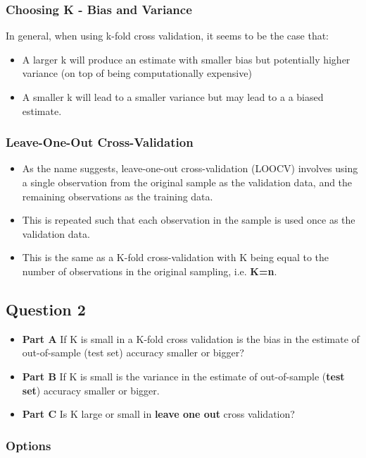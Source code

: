 \documentclass[caret-main.tex]{subfiles}
\begin{document}
\subsubsection{Choosing K - Bias and Variance}
In general, when using k-fold cross validation, it seems to be the case that:
\begin{itemize}
\item A larger k will produce an estimate with smaller bias but potentially higher variance (on top of being computationally expensive)
\item A smaller k will lead to a smaller variance but may lead to a a biased estimate.
\end{itemize}

\subsubsection{Leave-One-Out Cross-Validation}
\begin{itemize}
\item As the name suggests, leave-one-out cross-validation (LOOCV) involves using a single observation from the original sample as the validation data, and the remaining observations as the training data. 
\item This is repeated such that each observation in the sample is used once as the validation data. 
\item This is the same as a K-fold cross-validation with K being equal to the number of observations in the original sampling, i.e. \textbf{K=n}.
\end{itemize}

\newpage

\subsection*{Question 2}
\begin{itemize}
\item \textbf{Part A} If K is small in a K-fold cross validation is the bias in the estimate of
out-of-sample (test set) accuracy smaller or bigger? 
\item \textbf{Part B} If K is small is the
variance in the estimate of out-of-sample (\textbf{test set}) accuracy smaller or bigger.
\item \textbf{Part C} Is K large or small in \textbf{leave one out} cross validation?
\end{itemize}
\subsubsection*{Options}
\end{document}
